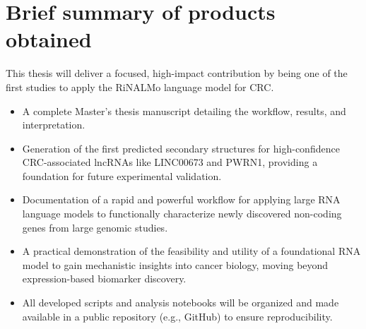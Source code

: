 \documentclass[ENG]{TFUOC}%
\begin{document}
\section{Brief summary of products obtained}

This thesis will deliver a focused, high-impact contribution by being one of the first studies to apply the RiNALMo language model for CRC.

\begin{itemize}
    \item A complete Master's thesis manuscript detailing the workflow, results, and interpretation.
    \item Generation of the first predicted secondary structures for high-confidence CRC-associated lncRNAs like LINC00673 and PWRN1, providing a foundation for future experimental validation.
    \item Documentation of a rapid and powerful workflow for applying large RNA language models to functionally characterize newly discovered non-coding genes from large genomic studies.
    \item A practical demonstration of the feasibility and utility of a foundational RNA model to gain mechanistic insights into cancer biology, moving beyond expression-based biomarker discovery.
    \item All developed scripts and analysis notebooks will be organized and made available in a public repository (e.g., GitHub) to ensure reproducibility.
\end{itemize}





\end{document}
